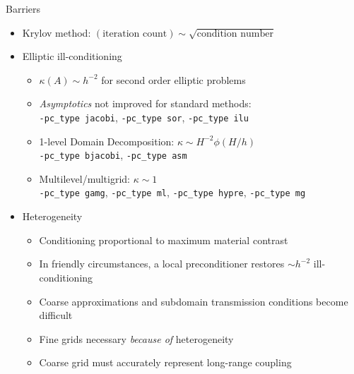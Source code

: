 \documentclass{beamer}
\begin{document}
\begin{frame}[fragile]{Barriers}
  \begin{itemize}
  \item Krylov method: $(\text{iteration count}) \sim \sqrt{\text{condition number}}$
  \item Elliptic ill-conditioning
    \begin{itemize}
    \item $\kappa(A) \sim h^{-2}$ for second order elliptic problems
    \item \emph{Asymptotics} not improved for standard methods:\\
      \verb|-pc_type jacobi|, \verb|-pc_type sor|, \verb|-pc_type ilu|
    \item 1-level Domain Decomposition: $\kappa \sim H^{-2} \phi(H/h)$ \\
      \verb|-pc_type bjacobi|, \verb|-pc_type asm|
    \item Multilevel/multigrid: $\kappa \sim 1$ \\
      \verb|-pc_type gamg|, \verb|-pc_type ml|, \verb|-pc_type hypre|, \verb|-pc_type mg|
    \end{itemize}
  \item Heterogeneity
    \begin{itemize}
    \item Conditioning proportional to maximum material contrast
    \item In friendly circumstances, a local preconditioner restores $\sim h^{-2}$ ill-conditioning
    \item Coarse approximations and subdomain transmission conditions become difficult
    \item Fine grids necessary \emph{because of} heterogeneity
    \item Coarse grid must accurately represent long-range coupling
    \end{itemize}
  \end{itemize}
\end{frame}
\end{document}
